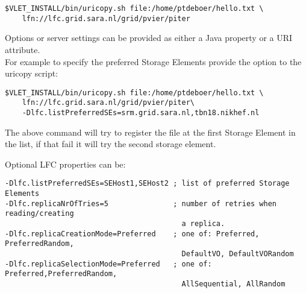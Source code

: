 \hspace*{10mm}\begin{minipage}{170mm}
\begin{verbatim}
$VLET_INSTALL/bin/uricopy.sh file:/home/ptdeboer/hello.txt \
	lfn://lfc.grid.sara.nl/grid/pvier/piter
\end{verbatim}
\end{minipage}

Options or server settings can be provided as either a Java property or a URI
attribute. \\
For example to specify the preferred Storage Elements provide the
\Emph{lfc.listPreferredSEs} option to the uricopy script:\\

\hspace*{10mm}\begin{minipage}{170mm}
\begin{verbatim}
$VLET_INSTALL/bin/uricopy.sh file:/home/ptdeboer/hello.txt \
	lfn://lfc.grid.sara.nl/grid/pvier/piter\
	-Dlfc.listPreferredSEs=srm.grid.sara.nl,tbn18.nikhef.nl
\end{verbatim}
\end{minipage}

The above command will try to register the file at the first Storage Element in
the list, if that fail it will try the second storage element. 

Optional LFC properties can be: \\

\hspace*{10mm}\begin{minipage}{170mm}
\begin{verbatim}
-Dlfc.listPreferredSEs=SEHost1,SEHost2 ; list of preferred Storage Elements
-Dlfc.replicaNrOfTries=5               ; number of retries when reading/creating
                                         a replica. 
-Dlfc.replicaCreationMode=Preferred    ; one of: Preferred, PreferredRandom,
                                         DefaultVO, DefaultVORandom 
-Dlfc.replicaSelectionMode=Preferred   ; one of: Preferred,PreferredRandom,
                                         AllSequential, AllRandom
\end{verbatim}
\end{minipage}\\

